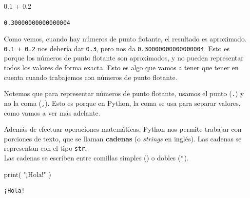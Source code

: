 \documentclass[
  letterpaper,
  DIV=11,
  numbers=noendperiod]{scrreprt}
\newenvironment{Shaded}{\begin{snugshade}}{\end{snugshade}}
\newcommand{\BuiltInTok}[1]{\textcolor[rgb]{0.00,0.23,0.31}{#1}}
\newcommand{\FloatTok}[1]{\textcolor[rgb]{0.68,0.00,0.00}{#1}}
\newcommand{\NormalTok}[1]{\textcolor[rgb]{0.00,0.23,0.31}{#1}}
\newcommand{\OperatorTok}[1]{\textcolor[rgb]{0.37,0.37,0.37}{#1}}
\newcommand{\StringTok}[1]{\textcolor[rgb]{0.13,0.47,0.30}{#1}}
\begin{document}
\begin{Shaded}
\begin{Highlighting}[]
\FloatTok{0.1} \OperatorTok{+} \FloatTok{0.2}
\end{Highlighting}
\end{Shaded}

\begin{verbatim}
0.30000000000000004
\end{verbatim}

Como vemos, cuando hay números de punto flotante, el resultado es
aproximado. \texttt{0.1\ +\ 0.2} nos debería dar \texttt{0.3}, pero nos
da \texttt{0.30000000000000004}. Esto es porque los números de punto
flotante son aproximados, y no pueden representar todos los valores de
forma exacta. Esto es algo que vamos a tener que tener en cuenta cuando
trabajemos con números de punto flotante.

\begin{tcolorbox}[enhanced jigsaw, colframe=quarto-callout-note-color-frame, opacityback=0, opacitybacktitle=0.6, bottomrule=.15mm, toprule=.15mm, coltitle=black, breakable, colback=white, leftrule=.75mm, titlerule=0mm, bottomtitle=1mm, toptitle=1mm, rightrule=.15mm, title=\textcolor{quarto-callout-note-color}{\faInfo}\hspace{0.5em}{Uso de punto}, arc=.35mm, left=2mm, colbacktitle=quarto-callout-note-color!10!white]

Notemos que para representar números de punto flotante, usamos el punto
(\texttt{.}) y no la coma (\texttt{,}). Esto es porque en Python, la
coma se usa para separar valores, como vamos a ver más adelante.

\end{tcolorbox}

Además de efectuar operaciones matemáticas, Python nos permite trabajar
con porciones de texto, que se llaman \textbf{cadenas} (o \emph{strings}
en inglés). Las cadenas se representan con el tipo \texttt{str}.\\
Las cadenas se escriben entre comillas simples
(\texttt{\textquotesingle{}}) o dobles (\texttt{"}).

\begin{Shaded}
\begin{Highlighting}[]
\BuiltInTok{print}\NormalTok{( }\StringTok{"¡Hola!"}\NormalTok{ )}
\end{Highlighting}
\end{Shaded}

\begin{verbatim}
¡Hola!
\end{verbatim}
\end{document}
